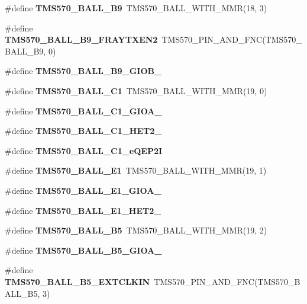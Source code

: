 \begin{DoxyCompactItemize}
\#define {\bfseries T\+M\+S570\+\_\+\+B\+A\+L\+L\+\_\+\+B9}~T\+M\+S570\+\_\+\+B\+A\+L\+L\+\_\+\+W\+I\+T\+H\+\_\+\+M\+MR(18, 3)
\item 
\mbox{\label{tms570lc4357-pins_8h_aead38528f7b771cb93d5fd0c3c95b78d}} 
\#define {\bfseries T\+M\+S570\+\_\+\+B\+A\+L\+L\+\_\+\+B9\+\_\+\+F\+R\+A\+Y\+T\+X\+E\+N2}~T\+M\+S570\+\_\+\+P\+I\+N\+\_\+\+A\+N\+D\+\_\+\+F\+NC(T\+M\+S570\+\_\+\+B\+A\+L\+L\+\_\+\+B9, 0)
\item 
\#define {\bfseries T\+M\+S570\+\_\+\+B\+A\+L\+L\+\_\+\+B9\+\_\+\+G\+I\+O\+B\+\_}
\item 
\mbox{\label{tms570lc4357-pins_8h_a376d17ae50601f9d94280e0364a7deae}} 
\#define {\bfseries T\+M\+S570\+\_\+\+B\+A\+L\+L\+\_\+\+C1}~T\+M\+S570\+\_\+\+B\+A\+L\+L\+\_\+\+W\+I\+T\+H\+\_\+\+M\+MR(19, 0)
\item 
\#define {\bfseries T\+M\+S570\+\_\+\+B\+A\+L\+L\+\_\+\+C1\+\_\+\+G\+I\+O\+A\+\_}
\item 
\#define {\bfseries T\+M\+S570\+\_\+\+B\+A\+L\+L\+\_\+\+C1\+\_\+\+H\+E\+T2\+\_}
\item 
\#define {\bfseries T\+M\+S570\+\_\+\+B\+A\+L\+L\+\_\+\+C1\+\_\+e\+Q\+E\+P2I}
\item 
\mbox{\label{tms570lc4357-pins_8h_a8759bcc00d8f368d9f69181fad373633}} 
\#define {\bfseries T\+M\+S570\+\_\+\+B\+A\+L\+L\+\_\+\+E1}~T\+M\+S570\+\_\+\+B\+A\+L\+L\+\_\+\+W\+I\+T\+H\+\_\+\+M\+MR(19, 1)
\item 
\#define {\bfseries T\+M\+S570\+\_\+\+B\+A\+L\+L\+\_\+\+E1\+\_\+\+G\+I\+O\+A\+\_}
\item 
\#define {\bfseries T\+M\+S570\+\_\+\+B\+A\+L\+L\+\_\+\+E1\+\_\+\+H\+E\+T2\+\_}
\item 
\mbox{\label{tms570lc4357-pins_8h_a56ff86ba1c80fd2bbbeead966feb9839}} 
\#define {\bfseries T\+M\+S570\+\_\+\+B\+A\+L\+L\+\_\+\+B5}~T\+M\+S570\+\_\+\+B\+A\+L\+L\+\_\+\+W\+I\+T\+H\+\_\+\+M\+MR(19, 2)
\item 
\#define {\bfseries T\+M\+S570\+\_\+\+B\+A\+L\+L\+\_\+\+B5\+\_\+\+G\+I\+O\+A\+\_}
\item 
\mbox{\label{tms570lc4357-pins_8h_a10e21eccc3572e6f06dc387d46f86fc7}} 
\#define {\bfseries T\+M\+S570\+\_\+\+B\+A\+L\+L\+\_\+\+B5\+\_\+\+E\+X\+T\+C\+L\+K\+IN}~T\+M\+S570\+\_\+\+P\+I\+N\+\_\+\+A\+N\+D\+\_\+\+F\+NC(T\+M\+S570\+\_\+\+B\+A\+L\+L\+\_\+\+B5, 3)

\end{DoxyCompactItemize}
